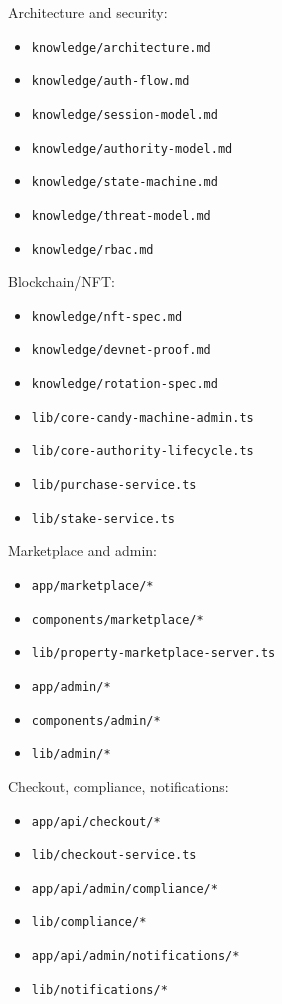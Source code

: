 \documentclass[
  10pt,
  letterpaper,
]{article}
\providecommand{\tightlist}{%
  \setlength{\itemsep}{0pt}\setlength{\parskip}{0pt}}
\let\oldtexttt\texttt
\renewcommand{\texttt}[1]{\oldtexttt{\small #1}}
\begin{document}
Architecture and security:

\begin{itemize}
\tightlist
\item
  \texttt{knowledge/architecture.md}
\item
  \texttt{knowledge/auth-flow.md}
\item
  \texttt{knowledge/session-model.md}
\item
  \texttt{knowledge/authority-model.md}
\item
  \texttt{knowledge/state-machine.md}
\item
  \texttt{knowledge/threat-model.md}
\item
  \texttt{knowledge/rbac.md}
\end{itemize}

Blockchain/NFT:

\begin{itemize}
\tightlist
\item
  \texttt{knowledge/nft-spec.md}
\item
  \texttt{knowledge/devnet-proof.md}
\item
  \texttt{knowledge/rotation-spec.md}
\item
  \texttt{lib/core-candy-machine-admin.ts}
\item
  \texttt{lib/core-authority-lifecycle.ts}
\item
  \texttt{lib/purchase-service.ts}
\item
  \texttt{lib/stake-service.ts}
\end{itemize}

Marketplace and admin:

\begin{itemize}
\tightlist
\item
  \texttt{app/marketplace/*}
\item
  \texttt{components/marketplace/*}
\item
  \texttt{lib/property-marketplace-server.ts}
\item
  \texttt{app/admin/*}
\item
  \texttt{components/admin/*}
\item
  \texttt{lib/admin/*}
\end{itemize}

Checkout, compliance, notifications:

\begin{itemize}
\tightlist
\item
  \texttt{app/api/checkout/*}
\item
  \texttt{lib/checkout-service.ts}
\item
  \texttt{app/api/admin/compliance/*}
\item
  \texttt{lib/compliance/*}
\item
  \texttt{app/api/admin/notifications/*}
\item
  \texttt{lib/notifications/*}
\end{itemize}
\end{document}
